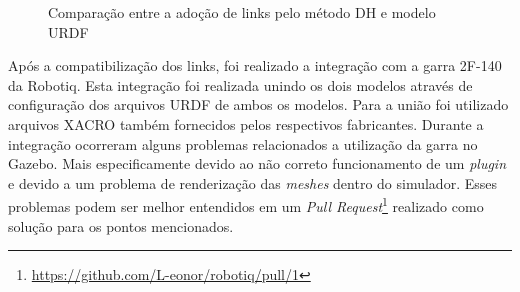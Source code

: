 \begin{figure}[htp]
	\centering
	\captionsetup{justification=centering}
	\caption{Comparação entre a adoção de links pelo método DH e modelo URDF}
	\label{fig:comparacao-entre-dh-e-urdf}
	\hfill%
\end{figure}

Após a compatibilização dos links, foi realizado a integração com a garra 2F-140 da Robotiq.
Esta integração foi realizada unindo os dois modelos através de configuração dos arquivos
URDF de ambos os modelos. Para a união foi utilizado arquivos XACRO também fornecidos
pelos respectivos fabricantes. Durante a integração ocorreram alguns problemas relacionados
a utilização da garra no Gazebo. Mais especificamente devido ao não correto funcionamento
de um \textit{plugin} e devido a um problema de renderização das \textit{meshes} dentro do simulador.
Esses problemas podem ser melhor entendidos em um 
\textit{Pull Request}\footnote{\url{https://github.com/L-eonor/robotiq/pull/1}}
realizado como solução para os pontos mencionados.

